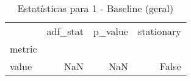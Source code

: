 \begin{table}[htbp]
\caption{Estatísticas para 1 - Baseline (geral)}
\label{tab:1_-_baseline_(geral)_adf_test}
\begin{tabular}{lrrr}
\toprule
 & adf_stat & p_value & stationary \\
metric &  &  &  \\
\midrule
value & NaN & NaN & False \\
\bottomrule
\end{tabular}
\end{table}
